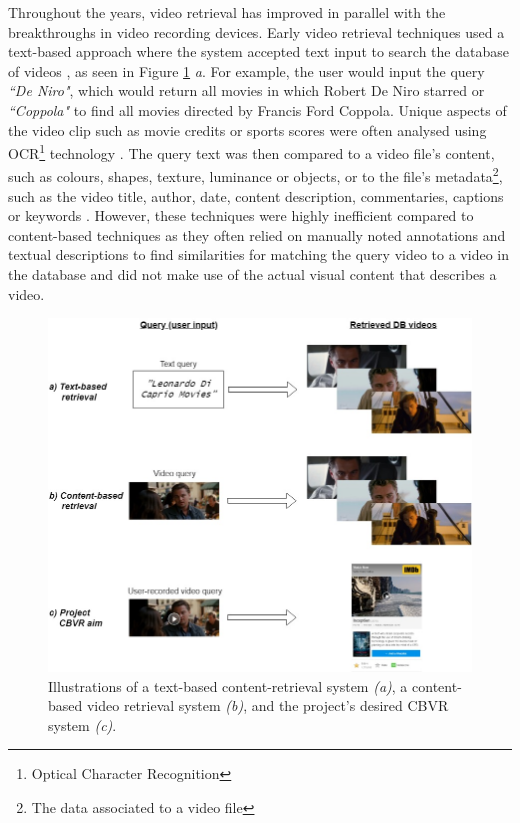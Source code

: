 \documentclass[11pt,openany,a4paper]{article}
\begin{document}
Throughout the years, video retrieval has improved in parallel with the breakthroughs in video recording devices. Early video retrieval techniques used a text-based approach where the system accepted text input to search the database of videos \cite{lai2015trajectory}, as seen in Figure \ref{fig:text_vs_content_retrieval} \emph{a}. For example, the user would input the query \textit{``De Niro"}, which would return all movies in which Robert De Niro starred or \textit{``Coppola"} to find all movies directed by Francis Ford Coppola. Unique aspects of the video clip such as movie credits or sports scores were often analysed using OCR\footnote{Optical Character Recognition} technology \cite{li2002text}. The query text was then compared to a video file's content, such as colours, shapes, texture, luminance or objects, or to the file's metadata\footnote{The data associated to a video file}, such as the video title, author, date, content description, commentaries, captions or keywords \cite{li2002text, feng2011, patel2012}. However, these techniques were highly inefficient compared to content-based techniques as they often relied on manually noted annotations and textual descriptions to find similarities for matching the query video to a video in the database and did not make use of the actual visual content that describes a video.\\

\begin{figure}[h]
\centerline{\includegraphics[width=\textwidth]{figures/content_text-retrieval_comparison.jpg}}
\caption{\label{fig:text_vs_content_retrieval}Illustrations of a text-based content-retrieval system \emph{(a)}, a content-based video retrieval system \emph{(b)}, and the project's desired CBVR system \emph{(c)}.}
\end{figure}
\end{document}
